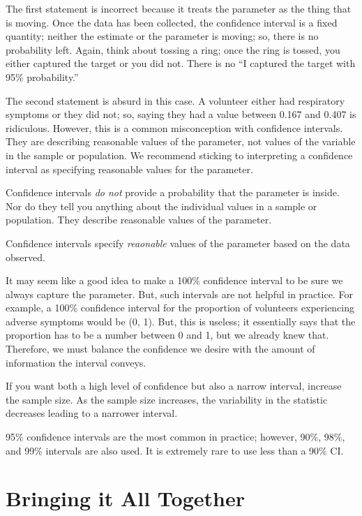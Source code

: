 \documentclass[]{book}
\theoremstyle{definition}
\theoremstyle{definition}
\theoremstyle{remark}
\let\BeginKnitrBlock\begin \let\EndKnitrBlock\end
\begin{document}
The first statement is incorrect because it treats the parameter as the
thing that is moving. Once the data has been collected, the confidence
interval is a fixed quantity; neither the estimate or the parameter is
moving; so, there is no probability left. Again, think about tossing a
ring; once the ring is tossed, you either captured the target or you did
not. There is no ``I captured the target with 95\% probability.''

The second statement is absurd in this case. A volunteer either had
respiratory symptoms or they did not; so, saying they had a value
between 0.167 and 0.407 is ridiculous. However, this is a common
misconception with confidence intervals. They are describing reasonable
values of the parameter, not values of the variable in the sample or
population. We recommend sticking to interpreting a confidence interval
as specifying reasonable values for the parameter.

\BeginKnitrBlock{rmdtip}
Confidence intervals \emph{do not} provide a probability that the
parameter is inside. Nor do they tell you anything about the individual
values in a sample or population. They describe reasonable values of the
parameter.
\EndKnitrBlock{rmdtip}

\BeginKnitrBlock{rmdkeyidea}
Confidence intervals specify \emph{reaonable} values of the parameter
based on the data observed.
\EndKnitrBlock{rmdkeyidea}

It may seem like a good idea to make a 100\% confidence interval to be
sure we always capture the parameter. But, such intervals are not
helpful in practice. For example, a 100\% confidence interval for the
proportion of volunteers experiencing adverse symptoms would be (0, 1).
But, this is useless; it essentially says that the proportion has to be
a number between 0 and 1, but we already knew that. Therefore, we must
balance the confidence we desire with the amount of information the
interval conveys.

\BeginKnitrBlock{rmdtip}
If you want both a high level of confidence but also a narrow interval,
increase the sample size. As the sample size increases, the variability
in the statistic decreases leading to a narrower interval.
\EndKnitrBlock{rmdtip}

\BeginKnitrBlock{rmdtip}
95\% confidence intervals are the most common in practice; however,
90\%, 98\%, and 99\% intervals are also used. It is extremely rare to
use less than a 90\% CI.
\EndKnitrBlock{rmdtip}

\section{Bringing it All Together}\label{bringing-it-all-together}
\end{document}
